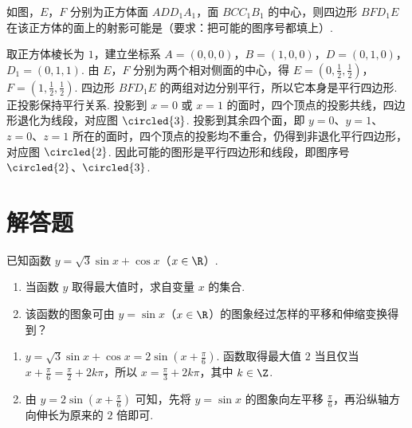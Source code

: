 \begin{problem}
如图，\(E\)，\(F\) 分别为正方体面 \(ADD_{1}A_{1}\)，面 \(BCC_{1}B_{1}\) 的中心，则四边形 \(BFD_{1}E\) 在该正方体的面上的射影可能是\fillinblank{}（要求：把可能的图序号都填上）.



\begin{solution}
取正方体棱长为 \(1\)，建立坐标系 \(A=(0,0,0)\)，\(B=(1,0,0)\)，\(D=(0,1,0)\)，\(D_1=(0,1,1)\). 由 \(E\)，\(F\) 分别为两个相对侧面的中心，得
\(E=\left(0,\frac12,\frac12\right)\)，\(F=\left(1,\frac12,\frac12\right)\).
四边形 \(BFD_1E\) 的两组对边分别平行，所以它本身是平行四边形. 正投影保持平行关系. 投影到 \(x=0\) 或 \(x=1\) 的面时，四个顶点的投影共线，四边形退化为线段，对应图 \(\circled{3}\). 投影到其余四个面，即 \(y=0\)、\(y=1\)、\(z=0\)、\(z=1\) 所在的面时，四个顶点的投影均不重合，仍得到非退化平行四边形，对应图 \(\circled{2}\). 因此可能的图形是平行四边形和线段，即图序号 \(\circled{2}\)、\(\circled{3}\).
\end{solution}
\end{problem}

\section{解答题}

\begin{problem}
已知函数 \(y=\sqrt{3}\sin x+\cos x\)（\(x\in\R\)）.

\begin{enumerate}
\item 当函数 \(y\) 取得最大值时，求自变量 \(x\) 的集合.
\item 该函数的图象可由 \(y=\sin x\)（\(x\in\R\)）的图象经过怎样的平移和伸缩变换得到？
\end{enumerate}

\begin{solution}
\begin{enumerate}
\item \(y=\sqrt3\sin x+\cos x=2\sin\left(x+\frac{\pi}{6}\right)\). 函数取得最大值 \(2\) 当且仅当 \(x+\frac{\pi}{6}=\frac{\pi}{2}+2k\pi\)，所以 \(x=\frac{\pi}{3}+2k\pi\)，其中 \(k\in\Z\).
\item 由 \(y=2\sin\left(x+\frac{\pi}{6}\right)\) 可知，先将 \(y=\sin x\) 的图象向左平移 \(\frac{\pi}{6}\)，再沿纵轴方向伸长为原来的 \(2\) 倍即可.
\end{enumerate}
\end{solution}
\end{problem}

